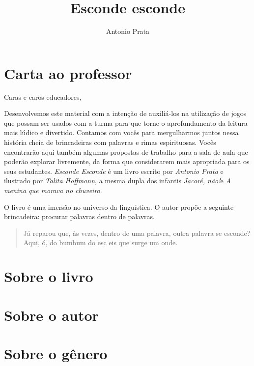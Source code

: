 \documentclass[11pt]{extarticle}
\newcommand{\AutorLivro}{Antonio Prata}
\newcommand{\TituloLivro}{Esconde esconde}
\newcommand{\colaborador}{Gabriela Karam}
\begin{document}
\title{\TituloLivro}
\author{\AutorLivro}
\def\authornotes{\colaborador}

\date{}
\maketitle


\tableofcontents

\section{Carta ao professor}

Caras e caros educadores,

Desenvolvemos este material com a intenção de auxiliá-los na utilização de jogos que possam ser usados com a turma para que torne o aprofundamento da leitura mais lúdico e divertido. Contamos com vocês para mergulharmos juntos nessa história cheia de brincadeiras com palavras e rimas espirituosas. Vocês encontrarão aqui também algumas propostas de trabalho para a sala de aula que poderão explorar livremente, da forma que considerarem mais apropriada para os seus estudantes. \textit{Esconde Esconde} é um livro escrito por \textit{Antonio Prata} e ilustrado por \textit{Talita Hoffmann}, a mesma dupla dos infantis \textit{Jacaré, não!}e \textit{A menina que morava no chuveiro}. 


O livro é uma imersão no universo da linguística. O autor propõe a seguinte brincadeira: procurar palavras dentro de palavras.

\begin{quote}

Já reparou que, às vezes, dentro de uma palavra, outra palavra se esconde? Aqui, ó, do bumbum do esc eis que surge um onde. 


\end{quote}

 \section{Sobre o livro}
 \section{Sobre o autor}
 \section{Sobre o gênero}
\end{document}
